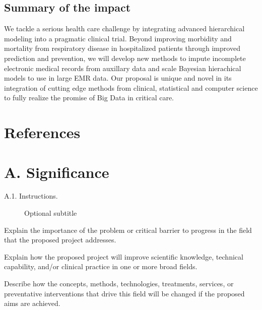 \documentclass[11pt,notitlepage]{article}
\begin{document}
\subsection{Summary of the impact}
We tackle a serious health care challenge by integrating advanced hierarchical modeling into a pragmatic clinical trial. Beyond improving morbidity and mortality from respiratory disease in hospitalized patients through improved prediction and prevention, we will develop new methods to impute incomplete electronic medical records from auxillary data and scale Bayesian hierachical models to use in large EMR data. Our proposal is unique and novel in its integration of cutting edge methods from clinical, statistical and computer science to fully realize the promise of Big Data in critical care.

\section{References}


\newpage

\section*{A. Significance}

\begin{description} %
\item[A.1. Instructions.]{Optional subtitle}
\end{description}

Explain the importance of the problem or critical barrier to progress in the field that the proposed project addresses.

Explain how the proposed project will improve scientific knowledge, technical capability, and/or clinical practice in one or more broad fields.

Describe how the concepts, methods, technologies, treatments, services, or preventative interventions that drive this field will be changed if the proposed aims are achieved.
\end{document}

